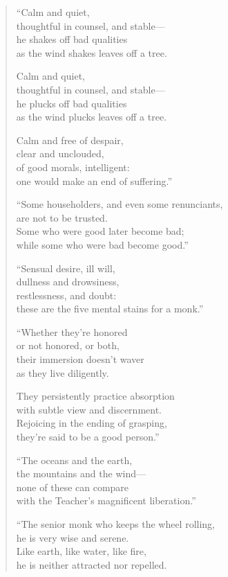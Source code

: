 \documentclass[12pt,openany]{book}%
\begin{document}
\begin{verse}
“Calm and quiet, \\
thoughtful in counsel, and stable—\\
he shakes off bad qualities \\
as the wind shakes leaves off a tree. 

Calm and quiet, \\
thoughtful in counsel, and stable—\\
he plucks off bad qualities \\
as the wind plucks leaves off a tree. 

Calm and free of despair, \\
clear and unclouded, \\
of good morals, intelligent: \\
one would make an end of suffering.” 

“Some householders, and even some renunciants, \\
are not to be trusted. \\
Some who were good later become bad; \\
while some who were bad become good.” 

“Sensual desire, ill will, \\
dullness and drowsiness, \\
restlessness, and doubt: \\
these are the five mental stains for a monk.” 

“Whether they’re honored \\
or not honored, or both, \\
their immersion doesn’t waver \\
as they live diligently. 

They persistently practice absorption \\
with subtle view and discernment. \\
Rejoicing in the ending of grasping, \\
they’re said to be a good person.” 

“The oceans and the earth, \\
the mountains and the wind—\\
none of these can compare \\
with the Teacher’s magnificent liberation.” 

“The senior monk who keeps the wheel rolling, \\
he is very wise and serene. \\
Like earth, like water, like fire, \\
he is neither attracted nor repelled. 


\end{verse}
\end{document}
